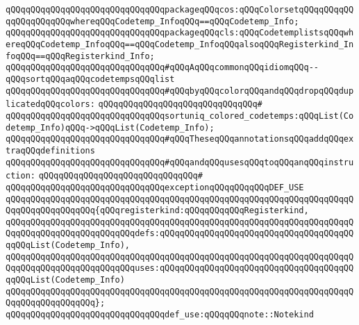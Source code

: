 \newline
\newline
\newline
\verb|qQQqqQQqqQQqqQQqqQQqqQQqqQQqqQQqpackageqQQqcos:qQQqColorsetqQQqqQQqqQQqqQQqqQQqqQQqwhereqQQqCodetemp_InfoqQQq==qQQqCodetemp_Info;|\newline
\verb|qQQqqQQqqQQqqQQqqQQqqQQqqQQqqQQqpackageqQQqcls:qQQqCodetemplistsqQQqwhereqQQqCodetemp_InfoqQQq==qQQqCodetemp_InfoqQQqalsoqQQqRegisterkind_InfoqQQq==qQQqRegisterkind_Info;|\newline
\newline
\verb|qQQqqQQqqQQqqQQqqQQqqQQqqQQqqQQq#qQQqAqQQqcommonqQQqidiomqQQq--qQQqsortqQQqaqQQqcodetempsqQQqlist|\newline
\verb|qQQqqQQqqQQqqQQqqQQqqQQqqQQqqQQq#qQQqbyqQQqcolorqQQqandqQQqdropqQQqduplicatedqQQqcolors:|\newline
\verb|qQQqqQQqqQQqqQQqqQQqqQQqqQQqqQQq#|\newline
\verb|qQQqqQQqqQQqqQQqqQQqqQQqqQQqqQQqsortuniq_colored_codetemps:qQQqList(Codetemp_Info)qQQq->qQQqList(Codetemp_Info);|\newline
\newline
\verb|qQQqqQQqqQQqqQQqqQQqqQQqqQQqqQQq#qQQqTheseqQQqannotationsqQQqaddqQQqextraqQQqdefinitions|\newline
\verb|qQQqqQQqqQQqqQQqqQQqqQQqqQQqqQQq#qQQqandqQQqusesqQQqtoqQQqanqQQqinstruction:|\newline
\verb|qQQqqQQqqQQqqQQqqQQqqQQqqQQqqQQq#|\newline
\verb|qQQqqQQqqQQqqQQqqQQqqQQqqQQqqQQqexceptionqQQqqQQqqQQqDEF_USE|\newline
\verb|qQQqqQQqqQQqqQQqqQQqqQQqqQQqqQQqqQQqqQQqqQQqqQQqqQQqqQQqqQQqqQQqqQQqqQQqqQQqqQQqqQQqqQQq{qQQqregisterkind:qQQqqQQqqQQqRegisterkind,|\newline
\verb|qQQqqQQqqQQqqQQqqQQqqQQqqQQqqQQqqQQqqQQqqQQqqQQqqQQqqQQqqQQqqQQqqQQqqQQqqQQqqQQqqQQqqQQqqQQqqQQqdefs:qQQqqQQqqQQqqQQqqQQqqQQqqQQqqQQqqQQqqQQqqQQqList(Codetemp_Info),|\newline
\verb|qQQqqQQqqQQqqQQqqQQqqQQqqQQqqQQqqQQqqQQqqQQqqQQqqQQqqQQqqQQqqQQqqQQqqQQqqQQqqQQqqQQqqQQqqQQqqQQquses:qQQqqQQqqQQqqQQqqQQqqQQqqQQqqQQqqQQqqQQqqQQqList(Codetemp_Info)|\newline
\verb|qQQqqQQqqQQqqQQqqQQqqQQqqQQqqQQqqQQqqQQqqQQqqQQqqQQqqQQqqQQqqQQqqQQqqQQqqQQqqQQqqQQqqQQq};|\newline
\newline
\verb|qQQqqQQqqQQqqQQqqQQqqQQqqQQqqQQqdef_use:qQQqqQQqnote::Notekind|\newline
